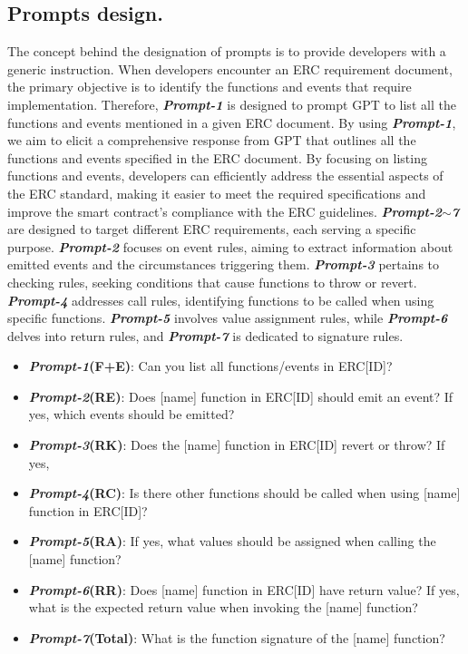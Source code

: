 \subsection{Prompts design.} 
The concept behind the designation of prompts is to provide developers with a generic instruction. 
When developers encounter an ERC requirement document, the primary objective is to identify the functions and events that require implementation. 
Therefore, \textbf{\textit{Prompt-1}} is designed to prompt GPT to list all the functions and events mentioned in a given ERC document. 
By using \textbf{\textit{Prompt-1}}, we aim to elicit a comprehensive response from GPT that outlines all the functions and events specified in the ERC document. 
By focusing on listing functions and events, developers can efficiently address the essential aspects of the ERC standard, 
making it easier to meet the required specifications and improve the smart contract's compliance with the ERC guidelines. 
\textbf{\textit{Prompt-2$\sim$7}} are designed to target different ERC requirements, each serving a specific purpose. 
\textbf{\textit{Prompt-2}} focuses on event rules, aiming to extract information about emitted events and the circumstances triggering them. 
\textbf{\textit{Prompt-3}} pertains to checking rules, seeking conditions that cause functions to throw or revert. \textbf{\textit{Prompt-4}} addresses call rules, 
identifying functions to be called when using specific functions. 
\textbf{\textit{Prompt-5}} involves value assignment rules, while \textbf{\textit{Prompt-6}} delves into return rules, 
and \textbf{\textit{Prompt-7}} is dedicated to signature rules. 

\begin{itemize}
    \item \textbf{\textit{Prompt-1}(F+E)}: Can you list all functions/events in ERC[ID]? 
    \item \textbf{\textit{Prompt-2}(RE)}: Does [name] function in ERC[ID] should emit an event? If yes, which events should be emitted?
    \item \textbf{\textit{Prompt-3}(RK)}: Does the [name] function in ERC[ID] revert or throw? If yes, 
    \item \textbf{\textit{Prompt-4}(RC)}: Is there other functions should be called when using [name] function in ERC[ID]?
    \item \textbf{\textit{Prompt-5}(RA)}: If yes, what values should be assigned when calling the [name] function?
    \item \textbf{\textit{Prompt-6}(RR)}: Does [name] function in ERC[ID] have return value? If yes, what is the expected return value when invoking the [name] function? 
    \item \textbf{\textit{Prompt-7}(Total)}: What is the function signature of the [name] function?
  \end{itemize}


